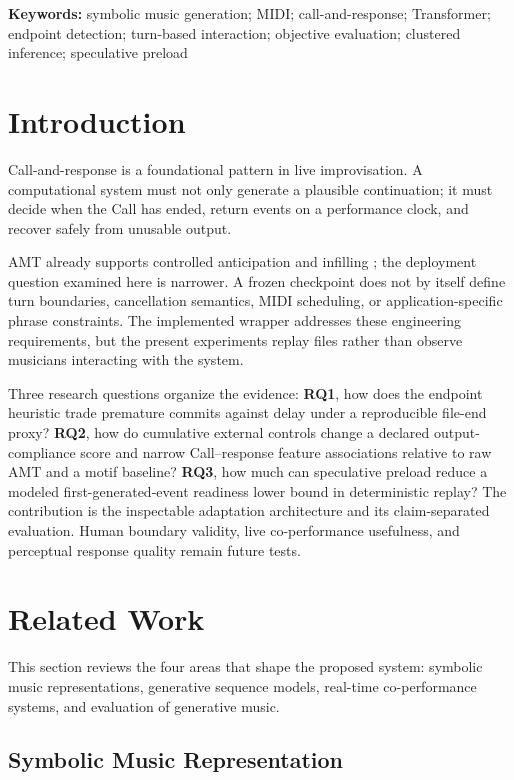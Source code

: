 \documentclass[11pt,a4paper]{article}
\begin{document}
\noindent\textbf{Keywords:} symbolic music generation; MIDI; call-and-response; Transformer; endpoint detection; turn-based interaction; objective evaluation; clustered inference; speculative preload

\section{Introduction}
\label{sec:introduction}
Call-and-response is a foundational pattern in live improvisation. A computational system must not only generate a plausible continuation; it must decide when the Call has ended, return events on a performance clock, and recover safely from unusable output.

AMT already supports controlled anticipation and infilling \citep{thickstun2023amt}; the deployment question examined here is narrower. A frozen checkpoint does not by itself define turn boundaries, cancellation semantics, MIDI scheduling, or application-specific phrase constraints. The implemented wrapper addresses these engineering requirements, but the present experiments replay files rather than observe musicians interacting with the system.

Three research questions organize the evidence: \textbf{RQ1}, how does the endpoint heuristic trade premature commits against delay under a reproducible file-end proxy? \textbf{RQ2}, how do cumulative external controls change a declared output-compliance score and narrow Call--response feature associations relative to raw AMT and a motif baseline? \textbf{RQ3}, how much can speculative preload reduce a modeled first-generated-event readiness lower bound in deterministic replay? The contribution is the inspectable adaptation architecture and its claim-separated evaluation. Human boundary validity, live co-performance usefulness, and perceptual response quality remain future tests.


\section{Related Work}
\label{sec:related-work}

This section reviews the four areas that shape the proposed system: symbolic music representations, generative sequence models, real-time co-performance systems, and evaluation of generative music.

\subsection{Symbolic Music Representation}
\end{document}
